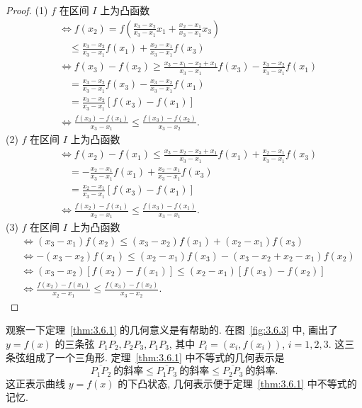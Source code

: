 \begin{proof}
(1) $f$ 在区间 $I$ 上为凸函数
\begin{align*}
&\Longleftrightarrow f(x_{2})=f\left(\frac{x_{3}-x_{2}}{x_{3}-x_{1}}x_{1}+\frac{x_{2}-x_{1}}{x_{3}-x_{1}}x_{3}\right)\\
&\quad\leqslant \frac{x_{3}-x_{2}}{x_{3}-x_{1}}f(x_{1})+\frac{x_{2}-x_{1}}{x_{3}-x_{1}}f(x_{3})\\
&\Longleftrightarrow f(x_{3})-f(x_{2})\geqslant \frac{x_{3}-x_{1}-x_{2}+x_{1}}{x_{3}-x_{1}}f(x_{3})-\frac{x_{3}-x_{2}}{x_{3}-x_{1}}f(x_{1})\\
&\quad=\frac{x_{3}-x_{2}}{x_{3}-x_{1}}f(x_{3})-\frac{x_{3}-x_{2}}{x_{3}-x_{1}}f(x_{1})\\
&\quad=\frac{x_{3}-x_{2}}{x_{3}-x_{1}}[f(x_{3})-f(x_{1})]\\
&\Longleftrightarrow \frac{f(x_{3})-f(x_{1})}{x_{3}-x_{1}}\leqslant \frac{f(x_{3})-f(x_{2})}{x_{3}-x_{2}}.
\end{align*}
(2) $f$ 在区间 $I$ 上为凸函数
\begin{align*}
&\Longleftrightarrow f(x_{2})-f(x_{1})\leqslant \frac{x_{3}-x_{2}-x_{3}+x_{1}}{x_{3}-x_{1}}f(x_{1})+\frac{x_{2}-x_{1}}{x_{3}-x_{1}}f(x_{3})\\
&\quad=-\frac{x_{2}-x_{1}}{x_{3}-x_{1}}f(x_{1})+\frac{x_{2}-x_{1}}{x_{3}-x_{1}}f(x_{3})\\
&\quad=\frac{x_{2}-x_{1}}{x_{3}-x_{1}}[f(x_{3})-f(x_{1})]\\
&\Longleftrightarrow \frac{f(x_{2})-f(x_{1})}{x_{2}-x_{1}}\leqslant \frac{f(x_{3})-f(x_{1})}{x_{3}-x_{1}}.
\end{align*}
(3) $f$ 在区间 $I$ 上为凸函数
\begin{align*}
&\Longleftrightarrow (x_{3}-x_{1})f(x_{2})\leqslant (x_{3}-x_{2})f(x_{1})+(x_{2}-x_{1})f(x_{3})\\
&\Longleftrightarrow -(x_{3}-x_{2})f(x_{1})\leqslant (x_{2}-x_{1})f(x_{3})-(x_{3}-x_{2}+x_{2}-x_{1})f(x_{2})\\
&\Longleftrightarrow (x_{3}-x_{2})[f(x_{2})-f(x_{1})]\leqslant (x_{2}-x_{1})[f(x_{3})-f(x_{2})]\\
&\Longleftrightarrow \frac{f(x_{2})-f(x_{1})}{x_{2}-x_{1}}\leqslant \frac{f(x_{3})-f(x_{2})}{x_{3}-x_{2}}.
\end{align*}
\end{proof}
观察一下定理~\ref{thm:3.6.1} 的几何意义是有帮助的. 在图~\ref{fig:3.6.3} 中, 画出了 $y=f(x)$ 的三条弦 $P_{1}P_{2},P_{2}P_{3},P_{1}P_{3}$, 其中 $P_{i}=(x_{i},f(x_{i}))$, $i=1,2,3$. 这三条弦组成了一个三角形. 定理~\ref{thm:3.6.1} 中不等式的几何表示是
\[
\overline{P_{1}P_{2}}\ \text{的斜率}\leqslant \overline{P_{1}P_{3}}\ \text{的斜率}\leqslant \overline{P_{2}P_{3}}\ \text{的斜率}.
\]
这正表示曲线 $y=f(x)$ 的下凸状态, 几何表示便于定理~\ref{thm:3.6.1} 中不等式的记忆.

